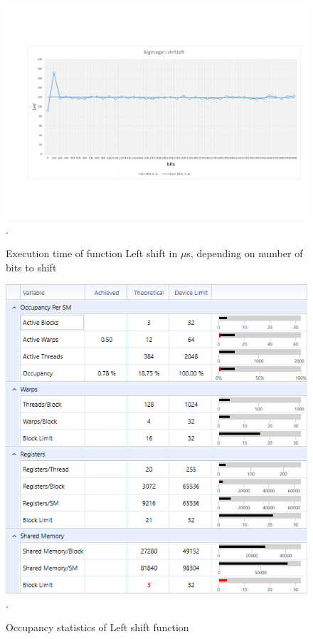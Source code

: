 \documentclass[oneside,openright,12pt,final,en]{mgr}
\begin{document}
\begin{figure}[H]
	\centering
	\includegraphics[width=\textwidth,trim={0.5cm 2.8cm 0.4cm 2.8cm},clip]{leftshift.pdf}.
	\caption{Execution time of function Left shift in $\mu$s, depending on number of bits to shift}
	\label{fig:leftshift}
\end{figure}

\begin{figure}[H]
	\centering
	\includegraphics[width=\textwidth]{leftshift_occupancy}.
	\caption{Occupancy statistics of Left shift function}
	\label{fig:leftshift_occupancy}
\end{figure}
\end{document}

